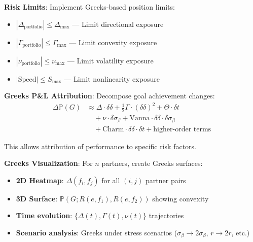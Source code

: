 \textbf{Risk Limits}: Implement Greeks-based position limits:
\begin{itemize}
\item $|\Delta_{\text{portfolio}}| \le \Delta_{\max}$ --- Limit directional exposure
\item $|\Gamma_{\text{portfolio}}| \le \Gamma_{\max}$ --- Limit convexity exposure
\item $|\nu_{\text{portfolio}}| \le \nu_{\max}$ --- Limit volatility exposure
\item $|\text{Speed}| \le S_{\max}$ --- Limit nonlinearity exposure
\end{itemize}

\textbf{Greeks P\&L Attribution}: Decompose goal achievement changes:
\begin{align*}
\Delta \mathbb{P}(G) &\approx \Delta \cdot \delta\delta + \frac{1}{2}\Gamma \cdot (\delta\delta)^2 + \Theta \cdot \delta t \\
&\quad + \nu \cdot \delta\sigma_\beta + \text{Vanna} \cdot \delta\delta \cdot \delta\sigma_\beta \\
&\quad + \text{Charm} \cdot \delta\delta \cdot \delta t + \text{higher-order terms}
\end{align*}

This allows attribution of performance to specific risk factors.

\textbf{Greeks Visualization}: For $n$ partners, create Greeks surfaces:
\begin{itemize}
\item \textbf{2D Heatmap}: $\Delta(f_i, f_j)$ for all $(i,j)$ partner pairs
\item \textbf{3D Surface}: $\mathbb{P}(G; R(e,f_1), R(e,f_2))$ showing convexity
\item \textbf{Time evolution}: $\{\Delta(t), \Gamma(t), \nu(t)\}$ trajectories
\item \textbf{Scenario analysis}: Greeks under stress scenarios ($\sigma_\beta \to 2\sigma_\beta$, $r \to 2r$, etc.)
\end{itemize}

